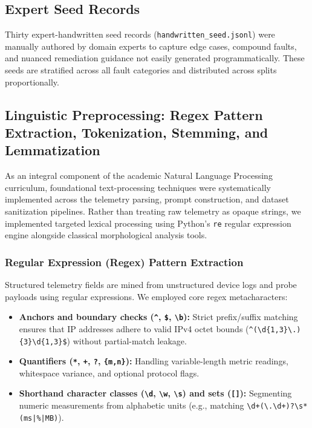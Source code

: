\documentclass[conference]{IEEEtran}
\begin{document}
\subsection{Expert Seed Records}

Thirty expert-handwritten seed records (\texttt{handwritten\_seed.jsonl}) were manually authored by domain experts to capture edge cases, compound faults, and nuanced remediation guidance not easily generated programmatically. These seeds are stratified across all fault categories and distributed across splits proportionally.

\subsection{Linguistic Preprocessing: Regex Pattern Extraction, Tokenization, Stemming, and Lemmatization}

As an integral component of the academic Natural Language Processing curriculum, foundational text-processing techniques were systematically implemented across the telemetry parsing, prompt construction, and dataset sanitization pipelines. Rather than treating raw telemetry as opaque strings, we implemented targeted lexical processing using Python's \texttt{re} regular expression engine alongside classical morphological analysis tools.

\subsubsection{Regular Expression (Regex) Pattern Extraction}
Structured telemetry fields are mined from unstructured device logs and probe payloads using regular expressions. We employed core regex metacharacters:
\begin{itemize}
    \item \textbf{Anchors and boundary checks (\texttt{\^{}}, \texttt{\$}, \texttt{\textbackslash b}):} Strict prefix/suffix matching ensures that IP addresses adhere to valid IPv4 octet bounds (\texttt{\^{}(\textbackslash d\{1,3\}\textbackslash.)\{3\}\textbackslash d\{1,3\}\$}) without partial-match leakage.
    \item \textbf{Quantifiers (\texttt{*}, \texttt{+}, \texttt{?}, \texttt{\{m,n\}}):} Handling variable-length metric readings, whitespace variance, and optional protocol flags.
    \item \textbf{Shorthand character classes (\texttt{\textbackslash d}, \texttt{\textbackslash w}, \texttt{\textbackslash s}) and sets (\texttt{[]}):} Segmenting numeric measurements from alphabetic units (e.g., matching \texttt{\textbackslash d+(\textbackslash.\textbackslash d+)?\textbackslash s*(ms|\%|MB)}).
\end{itemize}
\end{document}
